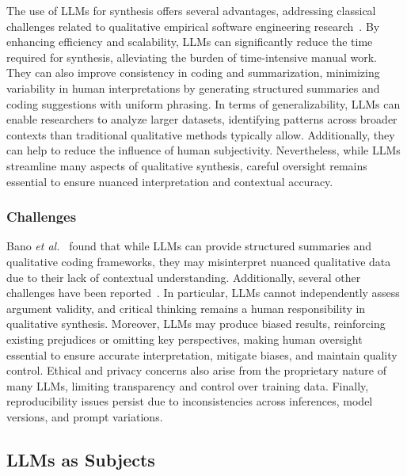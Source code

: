 The use of LLMs for synthesis offers several advantages, addressing classical challenges related to qualitative empirical software engineering research~\cite{DBLP:journals/ase/BanoHZT24, barros2024largelanguagemodelqualitative, leça2024applicationsimplicationslargelanguage}. By enhancing efficiency and scalability, LLMs can significantly reduce the time required for synthesis, alleviating the burden of time-intensive manual work. They can also improve consistency in coding and summarization, minimizing variability in human interpretations by generating structured summaries and coding suggestions with uniform phrasing. In terms of generalizability, LLMs can enable researchers to analyze larger datasets, identifying patterns across broader contexts than traditional qualitative methods typically allow. Additionally, they can help to reduce the influence of human subjectivity. Nevertheless, while LLMs streamline many aspects of qualitative synthesis, careful oversight remains essential to ensure nuanced interpretation and contextual accuracy.

\subsubsection{Challenges}

Bano \textit{et al.}~\cite{bano2023exploringqualitativeresearchusing} found that while LLMs can provide structured summaries and qualitative coding frameworks, they may misinterpret nuanced qualitative data due to their lack of contextual understanding. Additionally, several other challenges have been reported~\cite{DBLP:journals/ase/BanoHZT24, barros2024largelanguagemodelqualitative, leça2024applicationsimplicationslargelanguage}. In particular, LLMs cannot independently assess argument validity, and critical thinking remains a human responsibility in qualitative synthesis. Moreover, LLMs may produce biased results, reinforcing existing prejudices or omitting key perspectives, making human oversight essential to ensure accurate interpretation, mitigate biases, and maintain quality control. Ethical and privacy concerns also arise from the proprietary nature of many LLMs, limiting transparency and control over training data. Finally, reproducibility issues persist due to inconsistencies across inferences, model versions, and prompt variations.

\subsection{LLMs as Subjects}


